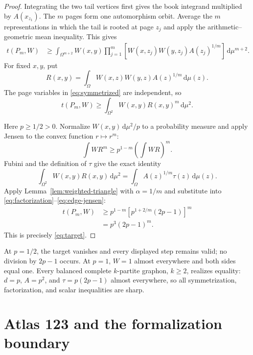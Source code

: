 \documentclass[11pt]{article}
\newcommand{\dd}{\,\mathrm d}
\begin{document}
\begin{proof}
Integrating the two tail vertices first gives the book integrand multiplied
by $A(x_{z_1})$.  The $m$ pages form one automorphism orbit.  Average the
$m$ representations in which the tail is rooted at page $z_j$ and apply
the arithmetic--geometric mean inequality.  This gives
\begin{align}
 t(P_m,W)
 &\geq
 \int_{\Omega^{m+2}}W(x,y)
 \prod_{j=1}^m
 \left[
 W(x,z_j)W(y,z_j)A(z_j)^{1/m}
 \right]
 \dd\mu^{m+2}.
 \label{eq:symmetrized}
\end{align}
For fixed $x,y$, put
\[
 R(x,y)=\int_\Omega
 W(x,z)W(y,z)A(z)^{1/m}\dd\mu(z).
\]
The page variables in \eqref{eq:symmetrized} are independent, so
\begin{equation}
 t(P_m,W)\geq\int_{\Omega^2}W(x,y)R(x,y)^m\dd\mu^2.
 \label{eq:factorization}
\end{equation}

Here $p\geq1/2>0$.  Normalize $W(x,y)\dd\mu^2/p$ to a probability
measure and apply Jensen to the convex function $r\mapsto r^m$:
\begin{equation}
 \int W R^m
 \geq p^{1-m}\left(\int W R\right)^m.
 \label{eq:edge-jensen}
\end{equation}
Fubini and the definition of $\tau$ give the exact identity
\begin{equation}
 \int_{\Omega^2}W(x,y)R(x,y)\dd\mu^2
 =\int_\Omega A(z)^{1/m}\tau(z)\dd\mu(z).
 \label{eq:rooted-identity}
\end{equation}
Apply Lemma~\ref{lem:weighted-triangle} with $\alpha=1/m$ and substitute
into \eqref{eq:factorization}--\eqref{eq:edge-jensen}:
\begin{align*}
 t(P_m,W)
 &\geq p^{1-m}
 \left[p^{1+2/m}(2p-1)\right]^m\\
 &=p^3(2p-1)^m.
\end{align*}
This is precisely \eqref{eq:target}.
\end{proof}

At $p=1/2$, the target vanishes and every displayed step remains valid;
no division by $2p-1$ occurs.  At $p=1$, $W=1$ almost everywhere and both
sides equal one.  Every balanced complete $k$-partite graphon, $k\geq2$,
realizes equality: $d=p$, $A=p^2$, and $\tau=p(2p-1)$ almost everywhere,
so all symmetrization, factorization, and scalar inequalities are sharp.


\section{Atlas 123 and the formalization boundary}
\end{document}
